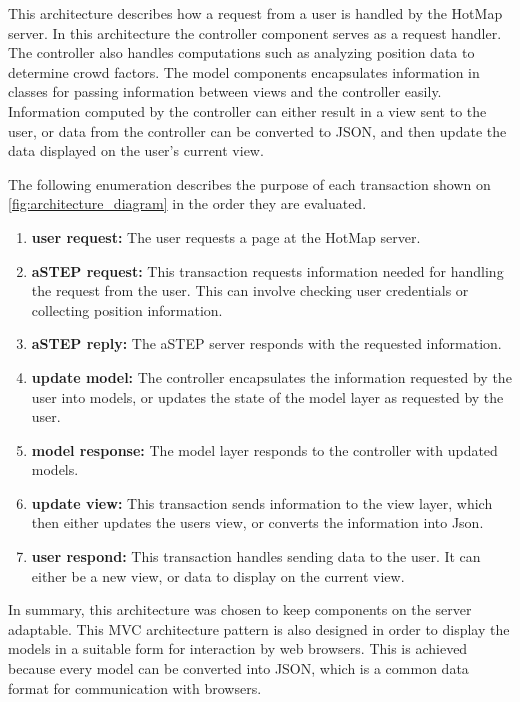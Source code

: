 
This architecture describes how a request from a user is handled by the HotMap server. In this architecture the controller component serves as a request handler. The controller also handles computations such as analyzing position data to determine crowd factors. The model components encapsulates information in classes for passing information between views and the controller easily. Information computed by the controller can either result in a view sent to the user, or data from the controller can be converted to JSON, and then update the data displayed on the user's current view. 


The following enumeration describes the purpose of each transaction shown on \cref{fig:architecture_diagram} in the order they are evaluated.

\begin{enumerate}
    \item \textbf{user request:} The user requests a page at the HotMap server.
    \item \textbf{aSTEP request:} This transaction requests information needed for handling the request from the user. This can involve checking user credentials or collecting position information.
    \item \textbf{aSTEP reply:} The aSTEP server responds with the requested information.
    \item \textbf{update model:} The controller encapsulates the information requested by the user into models, or updates the state of the model layer as requested by the user.
    \item \textbf{model response:} The model layer responds to the controller with updated models.
    \item \textbf{update view:} This transaction sends information to the view layer, which then either updates the users view, or converts the information into Json.
    \item \textbf{user respond:} This transaction handles sending data to the user. It can either be a new view, or data to display on the current view.
\end{enumerate}


In summary, this architecture was chosen to keep components on the server adaptable. This MVC architecture pattern is also designed in order to display the models in a suitable form for interaction by web browsers. This is achieved because every model can be converted into JSON, which is a common data format for communication with browsers.

